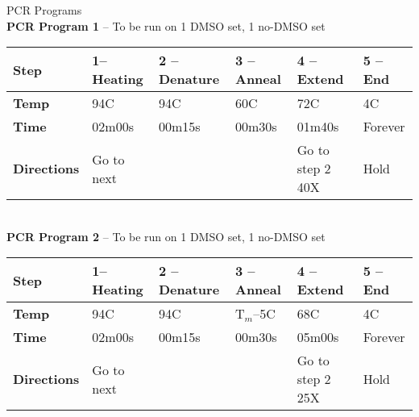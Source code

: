 \documentclass[a4paper,10pt]{article}
\begin{document}
\noindent PCR Programs\\
\textbf{PCR Program 1} -- To be run on 1 DMSO set, 1 no-DMSO set\\
\begin{tabular}{|l|l|l|l|l|l|}
\hline
\textbf{Step} & \textbf{1-- Heating} & \textbf{2 -- Denature} & \textbf{3 -- Anneal} & \textbf{4 -- Extend} & \textbf{5 -- End}\\
\hline
\textbf{Temp} & 94C & 94C & 60C & 72C & 4C\\
\hline
\textbf{Time} & 02m00s & 00m15s & 00m30s & 01m40s & Forever\\
\hline
\textbf{Directions} & Go to next & & & Go to step 2 40X & Hold\\
\hline
\end{tabular}\vspace{1em}\\
\textbf{PCR Program 2} -- To be run on 1 DMSO set, 1 no-DMSO set\\
\begin{tabular}{|l|l|l|l|l|l|}
\hline
\textbf{Step} & \textbf{1-- Heating} & \textbf{2 -- Denature} & \textbf{3 -- Anneal} & \textbf{4 -- Extend} & \textbf{5 -- End}\\
\hline
\textbf{Temp} & 94C & 94C & T$_m$--5C & 68C & 4C\\
\hline
\textbf{Time} & 02m00s & 00m15s & 00m30s & 05m00s & Forever\\
\hline
\textbf{Directions} & Go to next & & & Go to step 2 25X & Hold\\
\hline
\end{tabular}
\end{document}
